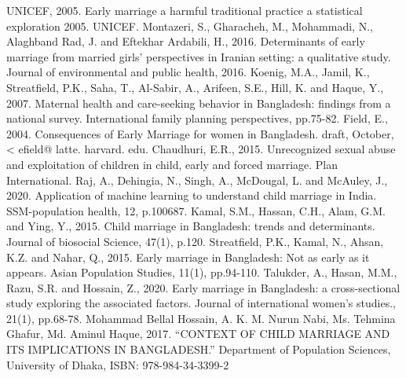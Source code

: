 \documentclass{article}
\begin{document}
\begin{thebibliography}{00}
     UNICEF, 2005. Early marriage a harmful traditional practice a statistical exploration 2005. UNICEF. 
     Montazeri, S., Gharacheh, M., Mohammadi, N., Alaghband Rad, J. and Eftekhar Ardabili, H., 2016. Determinants of early marriage from married girls’ perspectives in Iranian setting: a qualitative study. Journal of environmental and public health, 2016. 
     Koenig, M.A., Jamil, K., Streatfield, P.K., Saha, T., Al-Sabir, A., Arifeen, S.E., Hill, K. and Haque, Y., 2007. Maternal health and care-seeking behavior in Bangladesh: findings from a national survey. International family planning perspectives, pp.75-82. 
     Field, E., 2004. Consequences of Early Marriage for women in Bangladesh. draft, October, < efield@ latte. harvard. edu. 
     Chaudhuri, E.R., 2015. Unrecognized sexual abuse and exploitation of children in child, early and forced marriage. Plan International. 
     Raj, A., Dehingia, N., Singh, A., McDougal, L. and McAuley, J., 2020. Application of machine learning to understand child marriage in India. SSM-population health, 12, p.100687. 
     Kamal, S.M., Hassan, C.H., Alam, G.M. and Ying, Y., 2015. Child marriage in Bangladesh: trends and determinants. Journal of biosocial Science, 47(1), p.120. 
     Streatfield, P.K., Kamal, N., Ahsan, K.Z. and Nahar, Q., 2015. Early marriage in Bangladesh: Not as early as it appears. Asian Population Studies, 11(1), pp.94-110. 
     Talukder, A., Hasan, M.M., Razu, S.R. and Hossain, Z., 2020. Early marriage in Bangladesh: a cross-sectional study exploring the associated factors. Journal of international women's studies., 21(1), pp.68-78. 
     Mohammad Bellal Hossain, A. K. M. Nurun Nabi, Ms. Tehmina Ghafur, Md. Aminul Haque, 2017. “CONTEXT OF CHILD MARRIAGE AND ITS IMPLICATIONS IN BANGLADESH.” Department of Population Sciences, University of Dhaka, ISBN: 978-984-34-3399-2 
\end{thebibliography}
\end{document}
